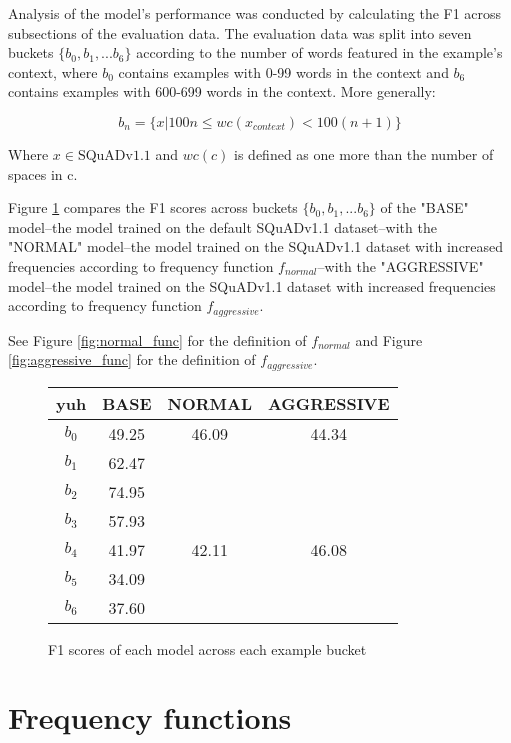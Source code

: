 \documentclass[twocolumn]{article}
\begin{document}
Analysis of the model's performance was conducted by calculating the F1 across subsections of the
evaluation data. The evaluation data was split into seven buckets $\{ b_0, b_1, ... b_6 \}$ according to the number of words
featured in the example's context, where $b_0$ contains examples with 0-99 words in the context and $b_6$ contains
examples with 600-699 words in the context. More generally:

\[
  b_n = \{x | 100n \leq wc(x_{context}) < 100(n+1) \}
\]

Where $x \in \text{SQuADv1.1}$ and $wc(c)$ is defined as one more than the number of spaces in c.

Figure \ref{fig:perf_table} compares the F1 scores across buckets $\{ b_0, b_1, ... b_6 \}$ of the "BASE" model--the model trained on the default SQuADv1.1 dataset--with
the "NORMAL" model--the model trained on the SQuADv1.1 dataset with increased frequencies according
to frequency function $f_{normal}$--with the "AGGRESSIVE" model--the model trained on the SQuADv1.1 dataset with increased frequencies according
to frequency function $f_{aggressive}$.

See Figure \ref{fig:normal_func} for the definition of $f_{normal}$
and Figure \ref{fig:aggressive_func} for the definition of $f_{aggressive}$.

\begin{figure}
\begin{center}
\begin{tabular}{ |c|c|c|c| }
 \hline
 yuh & BASE & NORMAL & AGGRESSIVE \\
 \hline
 $b_0$ & 49.25 & 46.09 & 44.34 \\
 \hline
 $b_1$ & 62.47 &  &  \\
 \hline
 $b_2$ & 74.95 &  &  \\
 \hline
 $b_3$ & 57.93 &  &  \\
 \hline
 $b_4$ & 41.97 & 42.11 & 46.08 \\
 \hline
 $b_5$ & 34.09 &  &  \\
 \hline
 $b_6$ & 37.60 &  &  \\
 \hline
\end{tabular}
\end{center}
  \caption{F1 scores of each model across each example bucket}
  \label{fig:perf_table}
\end{figure}

\section{Frequency functions}
\end{document}
